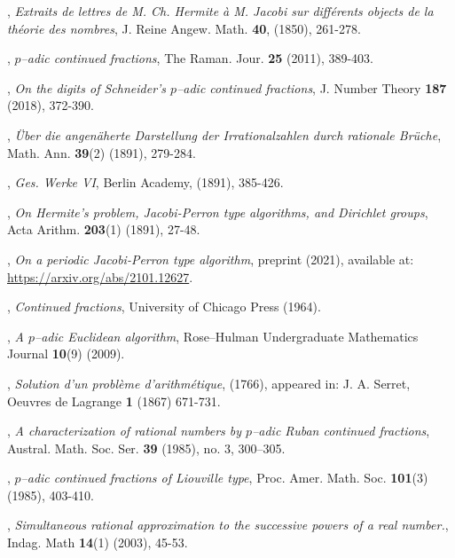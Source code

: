 \documentclass[12pt, reqno]{amsart}
\theoremstyle{plain}
\theoremstyle{definition}
\begin{document}
\begin{thebibliography}{}
,
\textit{Extraits de lettres de M. Ch. Hermite à M. Jacobi sur différents objects de la théorie des nombres},
\newblock J. Reine Angew. Math. \textbf{40}, (1850), 261-278.

,
\textit{$p$--adic continued fractions},
\newblock The Raman. Jour. \textbf{25} (2011), 389-403.

,
\textit{On the digits of Schneider's $p$--adic continued fractions}, 
\newblock  J. Number Theory \textbf{187} (2018), 372-390.

,
\textit{Über die angenäherte Darstellung der Irrationalzahlen durch rationale Brüche}, 
\newblock  Math. Ann. \textbf{39}(2) (1891), 279-284.

,
\textit{Ges. Werke VI},
\newblock Berlin Academy, (1891), 385-426.

,
\textit{On Hermite's problem, Jacobi-Perron type algorithms, and Dirichlet groups},
\newblock  Acta Arithm. \textbf{203}(1) (1891), 27-48.

,
\textit{On a periodic Jacobi-Perron type algorithm},
\newblock preprint (2021), available at: \href{https://arxiv.org/abs/2101.12627}{https://arxiv.org/abs/2101.12627}.

,
\textit{Continued fractions}, 
\newblock University of Chicago Press (1964).

,
\textit{A $p$--adic Euclidean algorithm}, 
\newblock Rose–Hulman Undergraduate Mathematics Journal \textbf{10}(9) (2009).

,
\textit{Solution d'un problème d'arithmétique}, 
\newblock (1766), appeared in: J. A. Serret, Oeuvres de Lagrange \textbf{1} (1867) 671-731.

,
\textit{A characterization of rational numbers by $p$--adic Ruban
continued fractions},
\newblock Austral. Math. Soc. Ser.  \textbf{39} (1985), no. 3, 300–305.

,
\textit{$p$--adic continued fractions of Liouville type},
\newblock Proc. Amer. Math. Soc.  \textbf{101}(3) (1985), 403-410.

,
\textit{Simultaneous rational approximation to the successive powers of a real number.},
\newblock Indag. Math  \textbf{14}(1) (2003), 45-53.


\end{thebibliography}
\end{document}
